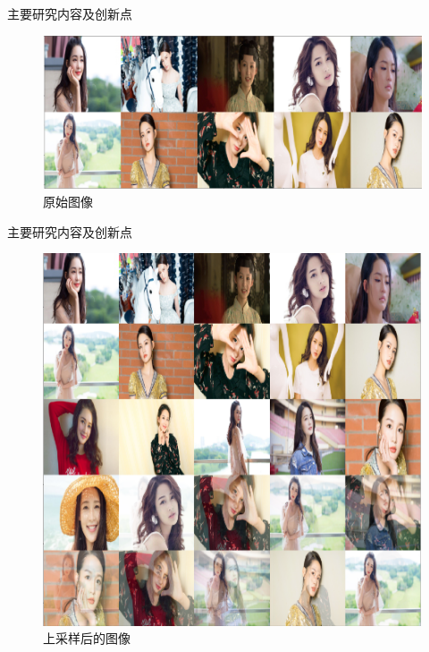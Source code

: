 \documentclass{beamer}
\begin{document}
\begin{frame}{主要研究内容及创新点}\pause
    \begin{figure}[t]
        \includegraphics[scale=0.2]{liTrue.png}
        \caption{原始图像}
    \end{figure}
\end{frame}


\begin{frame}{主要研究内容及创新点}\pause
    \begin{figure}[t]
        \includegraphics[scale=0.25]{liSMOTE1.png}
        \caption{上采样后的图像}
    \end{figure}
\end{frame}
\end{document}
